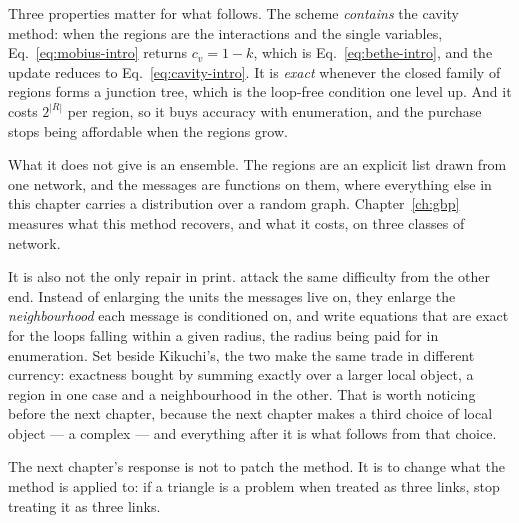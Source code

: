Three properties matter for what follows. The scheme \emph{contains} the
cavity method: when the regions are the interactions and the single variables,
Eq.~\eqref{eq:mobius-intro} returns $c_{v}=1-k$, which is
Eq.~\eqref{eq:bethe-intro}, and the update reduces to
Eq.~\eqref{eq:cavity-intro}. It is \emph{exact} whenever the closed family of
regions forms a junction tree, which is the loop-free condition one level up. And
it costs $2^{|R|}$ per region, so it buys accuracy with enumeration, and the
purchase stops being affordable when the regions grow.

What it does not give is an ensemble. The regions are an explicit list drawn
from one network, and the messages are functions on them, where everything else
in this chapter carries a distribution over a random graph.
Chapter~\ref{ch:gbp} measures what this method recovers, and what it costs, on
three classes of network.

It is also not the only repair in print. \citet{cantwell2019} attack the same
difficulty from the other end. Instead of enlarging the units the messages live
on, they enlarge the \emph{neighbourhood} each message is conditioned on, and
write equations that are exact for the loops falling within a given radius, the
radius being paid for in enumeration. Set beside Kikuchi's, the two make the
same trade in different currency: exactness bought by summing exactly over a
larger local object, a region in one case and a neighbourhood in the other. That
is worth noticing before the next chapter, because the next chapter makes a
third choice of local object --- a complex --- and everything after it is what
follows from that choice.

The next chapter's response is not to patch the method. It is to change what the
method is applied to: if a triangle is a problem when treated as three links,
stop treating it as three links.

